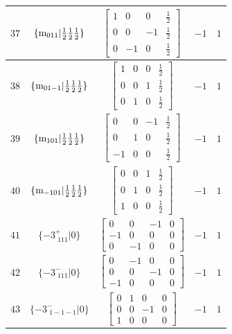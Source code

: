 \documentclass[fleqn,8pt]{jsarticle}
\begin{document}
\begin{longtable}{ccccc}
$ 37 $ & $ \{{\rm m}_{011}|\frac{1}{2} \frac{1}{2} \frac{1}{2}\} $ & $ \begin{bmatrix} 1 & 0 & 0 & \frac{1}{2} \\ 0 & 0 & -1 & \frac{1}{2} \\ 0 & -1 & 0 & \frac{1}{2} \end{bmatrix} $ & $ -1 $ & $ 1 $ \\ \hline
$ 38 $ & $ \{{\rm m}_{01-1}|\frac{1}{2} \frac{1}{2} \frac{1}{2}\} $ & $ \begin{bmatrix} 1 & 0 & 0 & \frac{1}{2} \\ 0 & 0 & 1 & \frac{1}{2} \\ 0 & 1 & 0 & \frac{1}{2} \end{bmatrix} $ & $ -1 $ & $ 1 $ \\ \hline
$ 39 $ & $ \{{\rm m}_{101}|\frac{1}{2} \frac{1}{2} \frac{1}{2}\} $ & $ \begin{bmatrix} 0 & 0 & -1 & \frac{1}{2} \\ 0 & 1 & 0 & \frac{1}{2} \\ -1 & 0 & 0 & \frac{1}{2} \end{bmatrix} $ & $ -1 $ & $ 1 $ \\ \hline
$ 40 $ & $ \{{\rm m}_{-101}|\frac{1}{2} \frac{1}{2} \frac{1}{2}\} $ & $ \begin{bmatrix} 0 & 0 & 1 & \frac{1}{2} \\ 0 & 1 & 0 & \frac{1}{2} \\ 1 & 0 & 0 & \frac{1}{2} \end{bmatrix} $ & $ -1 $ & $ 1 $ \\ \hline
$ 41 $ & $ \{-3^{+}_{\,\,111}|0\} $ & $ \begin{bmatrix} 0 & 0 & -1 & 0 \\ -1 & 0 & 0 & 0 \\ 0 & -1 & 0 & 0 \end{bmatrix} $ & $ -1 $ & $ 1 $ \\ \hline
$ 42 $ & $ \{-3^{-}_{\,\,111}|0\} $ & $ \begin{bmatrix} 0 & -1 & 0 & 0 \\ 0 & 0 & -1 & 0 \\ -1 & 0 & 0 & 0 \end{bmatrix} $ & $ -1 $ & $ 1 $ \\ \hline
$ 43 $ & $ \{-3^{-}_{\,\,1-1-1}|0\} $ & $ \begin{bmatrix} 0 & 1 & 0 & 0 \\ 0 & 0 & -1 & 0 \\ 1 & 0 & 0 & 0 \end{bmatrix} $ & $ -1 $ & $ 1 $ \\ \hline

\end{longtable}
\end{document}
